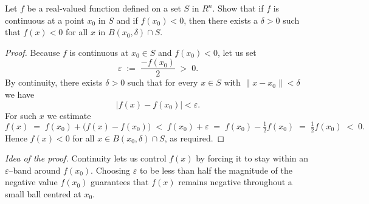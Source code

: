 \documentclass[10pt]{extarticle}
\begin{document}
\begin{exercise}[5.4]
    Let $f$ be a real-valued function defined on a set $S$ in $R ^n$. Show that if $f$ is continuous at a point $x _0$ in $S$ and if $f\left( x _0\right)<0$, then there exists a $\delta>0$ such that $f( x )<0$ for all $x$ in $B\left( x _0, \delta\right) \cap S$.
\end{exercise}

\begin{proof}
    Because $f$ is continuous at $x_{0}\in S$ and $f(x_{0})<0$, let us set
    \[
        \varepsilon\;:=\;\frac{-f(x_{0})}{2}\;>\;0.
    \]
    By continuity, there exists $\delta>0$ such that for every $x\in S$ with $\|x-x_{0}\|<\delta$ we have
    \[
        |f(x)-f(x_{0})|<\varepsilon.
    \]
    For such $x$ we estimate
    \[
        f(x)\;=\;f(x_{0})+\bigl(f(x)-f(x_{0})\bigr)\;<\;f(x_{0})+\varepsilon\;=\;f(x_{0})-\tfrac12 f(x_{0})\;=\;\tfrac12 f(x_{0})\;<\;0.
    \]
    Hence $f(x)<0$ for all $x\in B(x_{0},\delta)\cap S$, as required.
\end{proof}

\begin{remark}
    \emph{Idea of the proof.}  Continuity lets us control $f(x)$ by forcing it to stay within an $\varepsilon$--band around $f(x_{0})$.  Choosing $\varepsilon$ to be less than half the magnitude of the negative value $f(x_{0})$ guarantees that $f(x)$ remains negative throughout a small ball centred at $x_{0}$.
\end{remark}
\end{document}
